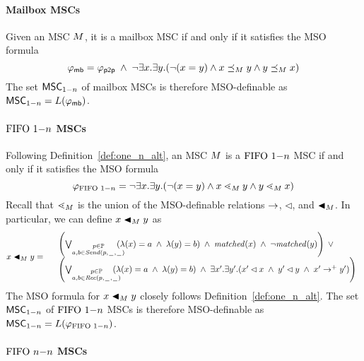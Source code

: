 \paragraph*{Mailbox MSCs}

Given an MSC $M$, it is a mailbox MSC if and only if it satisfies the MSO formula
\[
	\varphi_{\mathsf{mb}} = \varphi_{\mathsf{p2p}} \;\wedge\; \neg \exists x.\exists y.(\neg (x = y) \wedge x \preceq_M y \wedge y \preceq_M x)
\]
The set $\mathsf{MSC}_{1\mathsf{-}n}$ of mailbox MSCs is therefore MSO-definable as $\mathsf{MSC}_{1\mathsf{-}n}=L(\varphi_{\mathsf{mb}})$.

\paragraph*{$\text{FIFO } 1\mathsf{-}n$ MSCs}

Following Definition~\ref{def:one_n_alt}, an MSC $M$ is a $\text{FIFO } 1\mathsf{-}n$ MSC if and only if it satisfies the MSO formula
\[
	\varphi_{\text{FIFO } 1\mathsf{-}n} = \neg \exists x.\exists y.(\neg (x = y) \wedge x \lessdot_M y \wedge y \lessdot_M x)
\]
Recall that $\lessdot_M$ is the union of the MSO-definable relations $\to$, $\lhd$, and $\blacktriangleleft_M$. In particular, we can define $x \blacktriangleleft_M y$ as 
\[
x \blacktriangleleft_M y =
\begin{array}{rl}
& \left(
	\bigvee_{\substack{p \in \mathbb{P}\\a,b \in {\mathit{Send}(p,\hspace{0.1em}\underline{\hspace{0.5em}}\hspace{0.1em},\hspace{0.1em}\underline{\hspace{0.5em}}\hspace{0.1em})}}}\hspace{-1em}
	(\lambda(x) = a \;\wedge\; \lambda(y) = b)
	\;\wedge\; \mathit{matched}(x) \;\wedge\; \neg \mathit{matched}(y)
\right) \;\vee\\
& \left(
	\bigvee_{\substack{p \in \mathbb{P}\\a,b \in {\mathit{Rec}(p,\hspace{0.1em}\underline{\hspace{0.5em}}\hspace{0.1em},\hspace{0.1em}\underline{\hspace{0.5em}}\hspace{0.1em})}}}\hspace{-1em}
	(\lambda(x) = a \;\wedge\; \lambda(y) = b)
	\;\wedge\; 
	\exists x'.\exists y'. (x' \lhd x \;\wedge\; y' \lhd y \;\wedge\; x' \to^+ y')
\right)\\
\end{array}
\]
The MSO formula for $x \blacktriangleleft_M y$ closely follows Definition~\ref{def:one_n_alt}. The set $\mathsf{MSC}_{1\mathsf{-}n}$ of $\text{FIFO } 1\mathsf{-}n$ MSCs is therefore MSO-definable as $\mathsf{MSC}_{1\mathsf{-}n}=L(\varphi_{\text{FIFO } 1\mathsf{-}n})$.

\paragraph*{$\text{FIFO } n\mathsf{-}n$ MSCs}

